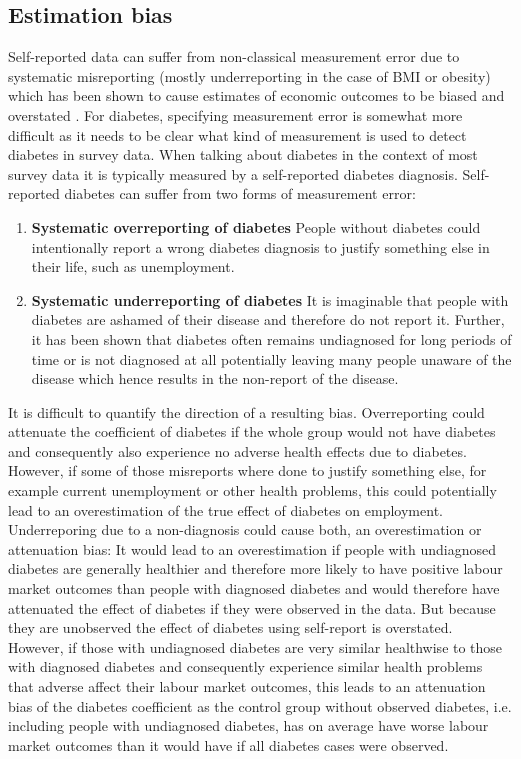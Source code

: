 \subsection{Estimation bias}

Self-reported data can suffer from non-classical measurement
error due to systematic misreporting (mostly underreporting in the
case of \ac{BMI} or obesity) which has been shown to cause estimates
of economic outcomes to be biased and overstated \citep{Cawley2015,ONeill2013,Perks2015}.
For diabetes, specifying measurement error is somewhat more difficult
as it needs to be clear what kind of measurement is used to detect
diabetes in survey data.
When talking about diabetes in the context of most survey data it
is typically measured by a self-reported diabetes diagnosis. Self-reported diabetes can suffer from two forms of measurement error:
\begin{enumerate}
\item \textbf{Systematic overreporting of diabetes}
People without diabetes could intentionally report a wrong diabetes diagnosis to justify something else in their life, such as unemployment.
\item \textbf{Systematic underreporting of diabetes}
It is imaginable that people with diabetes are ashamed of their disease and therefore do not report it. Further, it has been shown that diabetes often remains undiagnosed for long periods of time or is not diagnosed at all potentially leaving many people unaware of the disease which hence results in the non-report of the disease.
\end{enumerate}
It is difficult to quantify the direction of a resulting bias. Overreporting could attenuate the coefficient of diabetes if the whole group would not have diabetes and
consequently also experience no adverse health effects due to diabetes.
However, if some of those misreports where done to
justify something else, for example current unemployment or other health problems,
this could potentially lead to an overestimation of the true effect
of diabetes on employment. Underreporing due to a non-diagnosis could cause both, an overestimation or attenuation bias: It would lead to an overestimation if people with undiagnosed diabetes are generally healthier and therefore more likely to have positive labour market outcomes than people with diagnosed diabetes and would therefore have attenuated the effect of diabetes if they were observed in the data. But because they are unobserved the effect of diabetes using self-report is overstated. However, if those with undiagnosed diabetes are very similar healthwise to those with diagnosed diabetes and consequently experience similar health problems that adverse affect their labour market outcomes, this leads to an attenuation bias of the diabetes coefficient as the control group without observed diabetes, i.e. including people with undiagnosed diabetes, has on average have worse labour market outcomes than it would have if all diabetes cases were observed.

